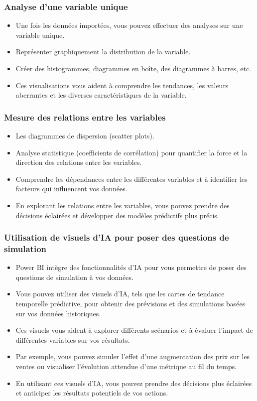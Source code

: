\documentclass{beamer}
\begin{document}
\begin{frame}
	\frametitle{Analyse d'une variable unique}
	
	\begin{itemize}
		\item Une fois les données importées, vous pouvez effectuer des analyses sur une variable unique.
		\item Représenter graphiquement la distribution de la variable.
		\item Créer des histogrammes, diagrammes en boîte, des diagrammes à barres, etc.
		\item Ces visualisations vous aident à comprendre les tendances, les valeurs aberrantes et les diverses caractéristiques de la variable.
	\end{itemize}
	
\end{frame}


\begin{frame}
	\frametitle{Mesure des relations entre les variables}
	
	\begin{itemize}
		\item Les diagrammes de dispersion (scatter plots).
		\item Analyse statistique (coefficients de corrélation) pour quantifier la force et la direction des relations entre les variables.
		\item Comprendre les dépendances entre les différentes variables et à identifier les facteurs qui influencent vos données.
		\item En explorant les relations entre les variables, vous pouvez prendre des décisions éclairées et développer des modèles prédictifs plus précis.
	\end{itemize}
	
\end{frame}




\begin{frame}
	\frametitle{Utilisation de visuels d'IA pour poser des questions de simulation}
	
	\begin{itemize}
		\item Power BI intègre des fonctionnalités d'IA pour vous permettre de poser des questions de simulation à vos données.
		\item Vous pouvez utiliser des visuels d'IA, tels que les cartes de tendance temporelle prédictive, pour obtenir des prévisions et des simulations basées sur vos données historiques.
		\item Ces visuels vous aident à explorer différents scénarios et à évaluer l'impact de différentes variables sur vos résultats.
		\item Par exemple, vous pouvez simuler l'effet d'une augmentation des prix sur les ventes ou visualiser l'évolution attendue d'une métrique au fil du temps.
		\item En utilisant ces visuels d'IA, vous pouvez prendre des décisions plus éclairées et anticiper les résultats potentiels de vos actions.
	\end{itemize}
	
\end{frame}
\end{document}

